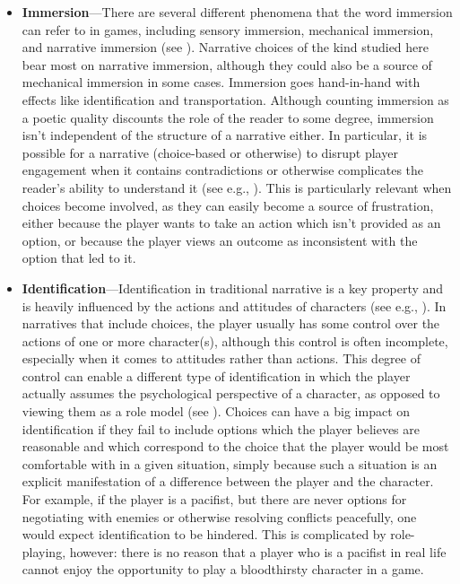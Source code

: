 \begin{itemize}
\item \textbf{Immersion}---There are several different phenomena that the word immersion can refer to in games, including sensory immersion, mechanical immersion, and narrative immersion (see \citep{Ermi2005}).
%
Narrative choices of the kind studied here bear most on narrative immersion, although they could also be a source of mechanical immersion in some cases.
%
Immersion goes hand-in-hand with effects like identification and transportation.
%
Although counting immersion as a poetic quality discounts the role of the reader to some degree, immersion isn't independent of the structure of a narrative either.
%
In particular, it is possible for a narrative (choice-based or otherwise) to disrupt player engagement when it contains contradictions or otherwise complicates the reader's ability to understand it (see e.g., \citep{Douglas2001}).
%
This is particularly relevant when choices become involved, as they can easily become a source of frustration, either because the player wants to take an action which isn't provided as an option, or because the player views an outcome as inconsistent with the option that led to it.


\item \textbf{Identification}---Identification in traditional narrative is a key property and is heavily influenced by the actions and attitudes of characters (see e.g., \citep{Feilitzen1975,Oatley1995}).
%
In narratives that include choices, the player usually has some control over the actions of one or more character(s), although this control is often incomplete, especially when it comes to attitudes rather than actions.
%
This degree of control can enable a different type of identification in which the player actually assumes the psychological perspective of a character, as opposed to viewing them as a role model (see \citep{Klimmt2009}).
%
Choices can have a big impact on identification if they fail to include options which the player believes are reasonable and which correspond to the choice that the player would be most comfortable with in a given situation, simply because such a situation is an explicit manifestation of a difference between the player and the character.
%
For example, if the player is a pacifist, but there are never options for negotiating with enemies or otherwise resolving conflicts peacefully, one would expect identification to be hindered.
%
This is complicated by role-playing, however: there is no reason that a player who is a pacifist in real life cannot enjoy the opportunity to play a bloodthirsty character in a game.



\end{itemize}
